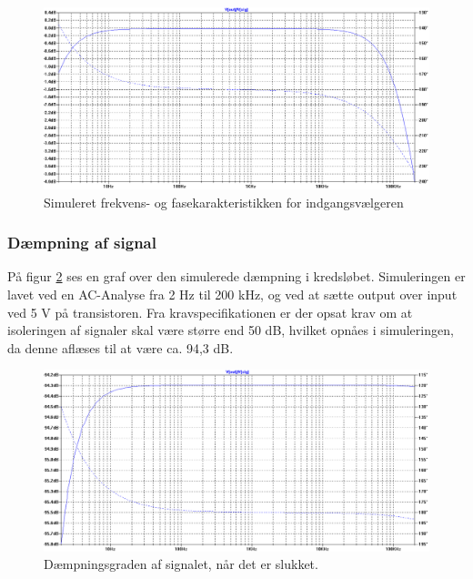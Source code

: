 \begin{figure}[h]
\centering
\includegraphics[width=\textwidth]{teknisk/indgangsvaelger/simulering/frekvenskarakteristik.png}
\caption{Simuleret frekvens- og fasekarakteristikken for indgangsvælgeren}
\label{indgangsvaelger_frekvenskarakteristik}
\end{figure}

\subsubsection*{Dæmpning af signal}
På figur \ref{indgangsvaelger_daempniing} ses en graf over den simulerede dæmpning i kredsløbet. Simuleringen er lavet ved en AC-Analyse fra 2 Hz til 200 kHz, og ved at sætte output over input ved 5 V på transistoren. Fra kravspecifikationen er der opsat krav om at isoleringen af signaler skal være større end 50 dB, hvilket opnåes i simuleringen, da denne aflæses til at være ca. 94,3 dB.

\begin{figure}[h]
\centering
\includegraphics[width=\textwidth]{teknisk/indgangsvaelger/simulering/daempning_af_signal.png}
\caption{Dæmpningsgraden af signalet, når det er slukket.}
\label{indgangsvaelger_daempniing}
\end{figure}


